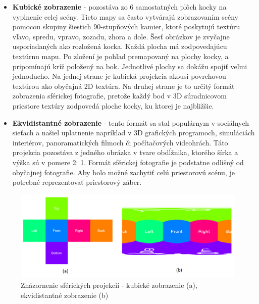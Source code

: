 \documentclass[slovak,master,dept460,male,cpp,cpdeclaration]{diploma}
\begin{document}
\begin{itemize}
\item \textbf{Kubické zobrazenie} -  pozostáva zo 6 samostatných plôch kocky na vyplnenie celej scény. Tieto mapy sa často vytvárajú zobrazovaním scény pomocou skupiny šiestich 90-stupňových kamier, ktoré poskytujú textúru vľavo, spredu, vpravo, zozadu, zhora a dole. Šesť obrázkov je zvyčajne usporiadaných ako rozložená kocka. Každá plocha  má zodpovedajúcu textúrnu mapu. Po zložení je pohľad premapovaný na plochy kocky, a pripomínajú kríž položený na bok. Jednotlivé plochy  sa dokážu spojiť veľmi jednoducho. Na jednej strane je kubická projekcia akousi povrchovou textúrou ako obyčajná 2D textúra. Na druhej strane je to určitý formát zobrazenia sférickej fotografie, pretože každý bod v 3D súradnicovom priestore textúry zodpovedá ploche kocky, ku ktorej je najbližšie.

\item \textbf{Ekvidistantné zobrazenie} - tento formát sa stal populárnym v sociálnych sieťach a našiel uplatnenie napríklad v 3D grafických programoch, simuláciách interiérov, panoramatických filmoch či počítačových videohrách. Táto projekcia pozostáva z jedného obrázka v tvare obdĺžnika, ktorého šírka a výška sú v pomere 2: 1. Formát sférickej fotografie je podstatne odlišný od obyčajnej fotografie. Aby bolo možné zachytiť celú priestorovú scénu, je potrebné reprezentovať priestorový záber.
\end{itemize}

\begin{figure}[H]
	\centering
	\includegraphics[width=1\textwidth]{Figures/sphericalModel2.png}
	\caption{Znázornenie sférických projekcií - kubické zobrazenie (a), ekvidistantné zobrazenie (b)}
	\label{fig:sphericalModel2}
\end{figure}
\end{document}
